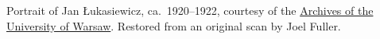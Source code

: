 Portrait of Jan {\L}ukasiewicz, ca.~1920--1922, courtesy of the
\href{http://www.archiwum.uw.edu.pl/}{Archives of the University
of Warsaw}.  Restored from an original scan by Joel Fuller.
